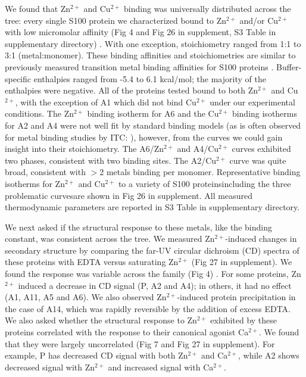 We found that Zn$^{2+}$ and Cu$^{2+}$ binding was universally distributed
across the tree: every single S100 protein we characterized bound
to Zn$^{2+}$ and/or Cu$^{2+}$ with low micromolar affinity (Fig
4 and Fig 26 in supplement, S3 Table in supplementary directory) \cite{damo_molecular_2013,koch_implications_2007,vorum_expression_1996,kordowska_ca2+_1998,fritz_crystal_2002,schafer_brain_2000,baudier_ions_1986}.
With one exception, stoichiometry ranged from 1:1 to 3:1 (metal:monomer).
These binding affinities and stoichiometries are similar to previously
measured transition metal binding affinities for S100 proteins \cite{gilston_binding_2016,vorum_expression_1996,schafer_brain_2000,moroz_both_2009}.
Buffer-specific enthalpies ranged from -5.4 to 6.1 kcal/mol; the majority
of the enthalpies were negative. All of the proteins tested bound
to both Zn$^{2+}$ and Cu$^{2+}$, with the exception of A1 which
did not bind Cu$^{2+}$ under our experimental conditions. The Zn$^{2+}$
binding isotherm for A6 and the Cu$^{2+}$ binding isotherms for A2
and A4 were not well fit by standard binding models (as is often observed
for metal binding studies by ITC: \cite{wilcox_isothermal_2008}),
however, from the curves we could gain insight into their stoichiometry.
The A6/Zn$^{2+}$ and A4/Cu$^{2+}$ curves exhibited two phases, consistent
with two binding sites. The A2/Cu$^{2+}$ curve was quite broad, consistent
with $>$2 metals binding per monomer. Representative binding isotherms
for Zn$^{2+}$ and Cu$^{2+}$ to a variety of S100 proteins\textemdash including
the three problematic curves\textemdash are shown in Fig 26 in supplement. All measured
thermodynamic parameters are reported in S3 Table in supplementary directory.

We next asked if the structural response to these metals, like the
binding constant, was consistent across the tree. We measured Zn$^{2+}$-induced
changes in secondary structure by comparing the far-UV circular dichroism
(CD) spectra of these proteins with EDTA versus saturating Zn$^{2+}$
(Fig 27 in supplement). We found the response was variable across the family (Fig
4) \cite{koch_implications_2007,vorum_expression_1996,schafer_brain_2000,sturchler_s100a16_2006,becker_s100p_1992,rety_crystal_1999,wilder_location_2003,wright_three-dimensional_2005,garrett_biosensor_2008,murray_structural_2012,babini_structural_2011}.
For some proteins, Zn$^{2+}$ induced a decrease in CD signal (P,
A2 and A4); in others, it had no effect (A1, A11, A5 and A6). We also
observed Zn$^{2+}$-induced protein precipitation in the case of A14,
which was rapidly reversible by the addition of excess EDTA. We also
asked whether the structural response to Zn$^{2+}$ exhibited by these
proteins correlated with the response to their canonical agonist Ca$^{2+}$.
We found that they were largely uncorrelated (Fig 7 and Fig 27 in supplement). For
example, P has decreased CD signal with both Zn$^{2+}$ and Ca$^{2+}$,
while A2 shows decreased signal with Zn$^{2+}$ and increased signal
with Ca$^{2+}$.

